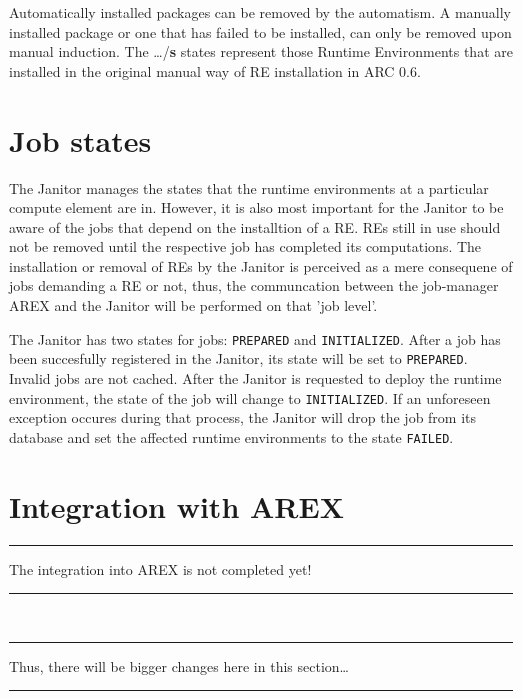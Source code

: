Automatically installed packages can be removed by the automatism. A
manually installed package or one that has failed to be installed,
can only be removed upon manual induction.  The \ldots/{\bf s} states
represent those Runtime Environments that are installed in the original
manual way of RE installation in ARC 0.6.



\section{Job states}

The Janitor manages the states that the runtime environments at a particular
compute element are in. However, it is also most important for the Janitor
to be aware of the jobs that depend on the installtion of a RE. REs still in use
should not be removed until the respective job has completed its computations.
The installation or removal of REs by the Janitor is perceived as a mere
consequene of jobs demanding a RE or not, thus, the communcation between
the job-manager AREX and the Janitor will be performed on that 'job level'.

The Janitor has two states for jobs: \texttt{PREPARED} and \texttt{INITIALIZED}. After a job has been succesfully registered 
in the Janitor, its state will be set to \texttt{PREPARED}. Invalid jobs are not cached. 
After the Janitor is requested to deploy the runtime environment, the state of the job will change to \texttt{INITIALIZED}. If 
an unforeseen exception occures during that process, the Janitor will drop the job from its database and set the affected runtime
environments to the state \texttt{FAILED}.

\section{Integration with AREX}


\newenvironment{note}
{\rule{1ex}{1ex}\hspace{\stretch{1}}}
{\rule{1ex}{1ex}\\}
\begin{note}
The integration into AREX is not completed yet!
\end{note}
\begin{note}
Thus, there will be bigger changes here in this section\dots
\end{note}


